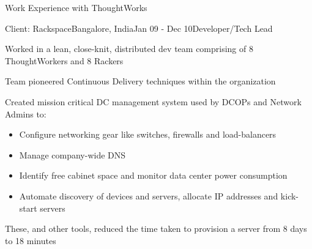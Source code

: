 \documentclass{resume} %
\begin{document}
\begin{rSection}{Work Experience with ThoughtWorks}

\begin{rSubsection}{Client: Rackspace}{Bangalore, India}{Jan 09 - Dec 10}{Developer/Tech Lead}
\item Worked in a lean, close-knit, distributed dev team comprising of 8 ThoughtWorkers and 8 Rackers
\item Team pioneered Continuous Delivery techniques within the organization
\item Created mission critical DC management system used by
  DCOPs and Network Admins to:
\begin{itemize}  \itemsep0.5pt \parskip0pt
    \item Configure networking gear like switches, firewalls and load-balancers
    \item Manage company-wide DNS
    \item Identify free cabinet space and monitor data center power consumption
    \item Automate discovery of devices and servers, allocate IP addresses and kick-start servers
\end{itemize}
\item These, and other tools, reduced the time taken to provision a server from 8 days to 18 minutes
\end{rSubsection}

\end{rSection}

\end{document}

